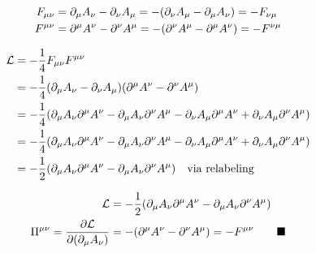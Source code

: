 \documentclass{article}
\begin{document}
\begin{align*}
  F_{\mu\nu} & =\partial_\mu A_\nu-\partial_\nu A_\mu=-\pqty{\partial_\nu A_\mu-\partial_\mu A_\nu} =-F_{\nu\mu} \\
  F^{\mu\nu} & =\partial^\mu A^\nu-\partial^\nu A^\mu=-\pqty{\partial^\nu A^\mu-\partial^\mu A^\nu} =-F^{\nu\mu} \\
\end{align*}

\begin{align*}
  \mathcal{L} & =-\frac{1}{4}F_{\mu\nu}F^{\mu\nu}                                                                                                                                              \\
              & =-\frac{1}{4}\pqty{\partial_\mu A_\nu - \partial_\nu A_\mu}\pqty{\partial^\mu A^\nu-\partial^\nu A^\mu}                                                                        \\
              & =-\frac{1}{4}\pqty{\partial_\mu A_\nu \partial^\mu A^\nu -\partial_\mu A_\nu \partial^\nu A^\mu - \partial_\nu A_\mu \partial^\mu A^\nu+\partial_\nu A_\mu \partial^\nu A^\mu} \\
              & =-\frac{1}{4}\pqty{\partial_\mu A_\nu \partial^\mu A^\nu -\partial_\mu A_\nu \partial^\nu A^\mu - \partial_\nu A_\mu \partial^\mu A^\nu+\partial_\nu A_\mu \partial^\nu A^\mu} \\
              & =-\frac{1}{2}\pqty{\partial_\mu A_\nu \partial^\mu A^\nu -\partial_\mu A_\nu \partial^\nu A^\mu} \qq{via relabeling}                                                           \\
\end{align*}

\begin{align*}
  \mathcal{L}                                                & =-\frac{1}{2}\pqty{\partial_\mu A_\nu \partial^\mu A^\nu -\partial_\mu A_\nu \partial^\nu A^\mu} \\
  \Pi^{\mu\nu}= \pdv{\mathcal{L}}{\pqty{\partial_\mu A_\nu}} & =-\pqty{\partial^\mu A^\nu -\partial^\nu A^\mu}=-F^{\mu\nu}  \qquad\blacksquare                  \\
\end{align*}
\end{document}
